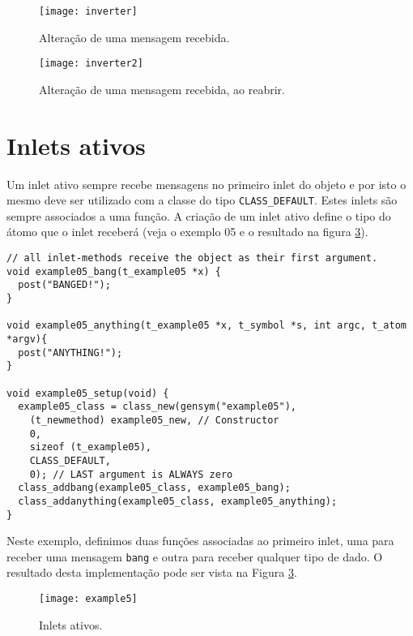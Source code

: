 \begin{figure}[h!]
\centering
\texttt{[image: inverter]}
\caption{Alteração de uma mensagem recebida.}
\label{fig:inverter}
\end{figure}

\begin{figure}[h!]
\centering
\texttt{[image: inverter2]}
\caption{Alteração de uma mensagem recebida, ao reabrir.}
\label{fig:inverter2}
\end{figure}


\section{Inlets ativos}

Um inlet ativo sempre recebe mensagens no primeiro inlet do objeto e por isto
o mesmo deve ser utilizado com a classe do tipo \texttt{CLASS\_DEFAULT}.
Estes inlets são sempre associados a uma função.
A criação de um inlet ativo define o tipo do átomo que o inlet receberá (veja o
exemplo 05 e o resultado na figura \ref{fig:inlet-ativo}).

\begin{lstlisting}[caption=Exemplo de objeto com inlet ativo]
// all inlet-methods receive the object as their first argument.
void example05_bang(t_example05 *x) { 
  post("BANGED!");
}

void example05_anything(t_example05 *x, t_symbol *s, int argc, t_atom *argv){
  post("ANYTHING!");
}

void example05_setup(void) {
  example05_class = class_new(gensym("example05"),
    (t_newmethod) example05_new, // Constructor
    0, 
    sizeof (t_example05),
    CLASS_DEFAULT,
    0); // LAST argument is ALWAYS zero
  class_addbang(example05_class, example05_bang);
  class_addanything(example05_class, example05_anything);
}
\end{lstlisting}

Neste exemplo, definimos duas funções associadas ao primeiro inlet, uma para
receber uma mensagem \texttt{bang} e outra para receber qualquer tipo de dado.
O resultado desta implementação pode ser vista na Figura \ref{fig:inlet-ativo}.

\begin{figure}[h!]
\centering
\texttt{[image: example5]}
\caption{Inlets ativos.}
\label{fig:inlet-ativo}
\end{figure}

